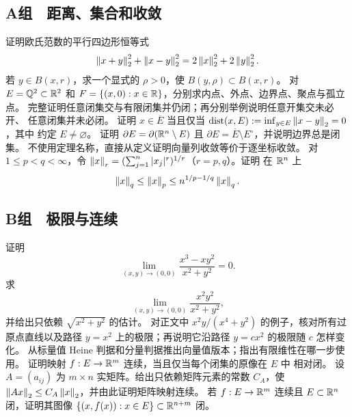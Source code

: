 \subsection*{A组　距离、集合和收敛}
\begin{enumerate}[label=\textbf{\thechapter.\arabic*.}]
 证明欧氏范数的平行四边形恒等式
 \[
  \left\lVert x+y\right\rVert_2^2+\left\lVert x-y\right\rVert_2^2
  =2\left\lVert x\right\rVert_2^2+2\left\lVert y\right\rVert_2^2.
 \]
 若 \(y\in B(x,r)\)，求一个显式的 \(\rho>0\)，使
 \(B(y,\rho)\subset B(x,r)\)。
 对 \(E=\mathbb{Q}^2\subset\mathbb{R}^2\) 和
 \(F=\{(x,0):x\in\mathbb{R}\}\)，分别求内点、外点、边界点、聚点与孤立点。
 完整证明任意闭集交与有限闭集并仍闭；再分别举例说明任意开集交未必开、
 任意闭集并未必闭。
 证明 \(x\in\overline E\) 当且仅当
 \(\operatorname{dist}(x,E):=\inf_{y\in E}\left\lVert x-y\right\rVert_2=0\)，其中
 约定 \(E\ne\varnothing\)。
 证明
 \(\partial E=\partial(\mathbb{R}^n\setminus E)\) 且
 \(\partial E=\overline E\setminus E^\circ\)，并说明边界总是闭集。
 不使用定理名称，直接从定义证明向量列收敛等价于逐坐标收敛。
 对 \(1\le p<q<\infty\)，令
 \(\left\lVert x\right\rVert_r=(\sum_{j=1}^n|x_j|^r)^{1/r}\)（\(r=p,q\)）。证明
 在 \(\mathbb{R}^n\) 上
 \[
  \left\lVert x\right\rVert_q\le\left\lVert x\right\rVert_p\le n^{1/p-1/q}\left\lVert x\right\rVert_q.
 \]
\end{enumerate}

\subsection*{B组　极限与连续}
\begin{enumerate}[label=\textbf{\thechapter.\arabic*.},resume]
 证明
 \[
  \lim_{(x,y)\to(0,0)}
  \frac{x^3-xy^2}{x^2+y^2}=0.
 \]
 求
 \[
  \lim_{(x,y)\to(0,0)}\frac{x^2y^2}{x^2+y^2},
 \]
 并给出只依赖 \(\sqrt{x^2+y^2}\) 的估计。
 对正文中
 \(x^2y/(x^4+y^2)\) 的例子，核对所有过原点直线以及路径 \(y=x^2\)
 上的极限；再说明它沿路径 \(y=cx^2\) 的极限随 \(c\) 怎样变化。
 从标量值 Heine 判据和分量判据推出向量值版本；指出有限维性在哪一步使用。
 证明映射 \(f:E\to\mathbb{R}^m\) 连续，当且仅当每个闭集的原像在 \(E\) 中
 相对闭。
 设 \(A=(a_{ij})\) 为 \(m\times n\) 实矩阵。给出只依赖矩阵元素的常数
 \(C_A\)，使 \(\left\lVert Ax\right\rVert_2\le C_A\left\lVert x\right\rVert_2\)，并由此证明矩阵映射连续。
 若 \(f:E\to\mathbb{R}^m\) 连续且 \(E\subset\mathbb{R}^n\) 闭，证明其图像
 \(\{(x,f(x)):x\in E\}\subset\mathbb{R}^{n+m}\) 闭。
\end{enumerate}


